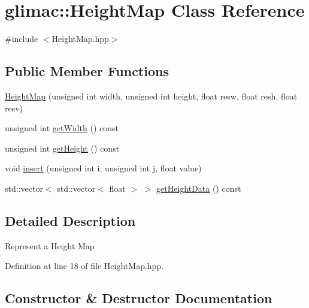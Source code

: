 \hypertarget{classglimac_1_1_height_map}{}\section{glimac\+:\+:Height\+Map Class Reference}
\label{classglimac_1_1_height_map}


{\ttfamily \#include $<$Height\+Map.\+hpp$>$}

\subsection*{Public Member Functions}
\begin{DoxyCompactItemize}
\item 
\hyperlink{classglimac_1_1_height_map_a512bb9cd033c9da607f3311b00a46ad8}{Height\+Map} (unsigned int width, unsigned int height, float resw, float resh, float resv)
\item 
unsigned int \hyperlink{classglimac_1_1_height_map_ab1e48683d69d8babea763adff3d02d10}{get\+Width} () const
\item 
unsigned int \hyperlink{classglimac_1_1_height_map_a39288ae594f75d66aeb364832ec0adc1}{get\+Height} () const
\item 
void \hyperlink{classglimac_1_1_height_map_a4f20bdf9b7147e7795cf78a181dc3458}{insert} (unsigned int i, unsigned int j, float value)
\item 
std\+::vector$<$ std\+::vector$<$ float $>$ $>$ \hyperlink{classglimac_1_1_height_map_a5b4bb1e8f62b95d8058c307dddcdd412}{get\+Height\+Data} () const
\end{DoxyCompactItemize}


\subsection{Detailed Description}
Represent a Height Map 

Definition at line 18 of file Height\+Map.\+hpp.



\subsection{Constructor \& Destructor Documentation}
\mbox{\label{classglimac_1_1_height_map_a512bb9cd033c9da607f3311b00a46ad8}} 
